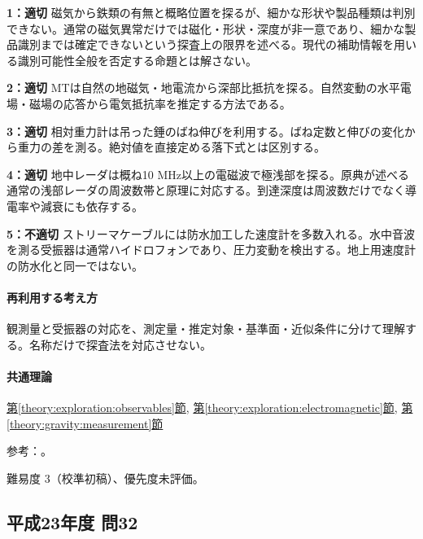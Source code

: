 \noindent\textbf{1：適切} 磁気から鉄類の有無と概略位置を探るが、細かな形状や製品種類は判別できない。通常の磁気異常だけでは磁化・形状・深度が非一意であり、細かな製品識別までは確定できないという探査上の限界を述べる。現代の補助情報を用いる識別可能性全般を否定する命題とは解さない。\par

\noindent\textbf{2：適切} MTは自然の地磁気・地電流から深部比抵抗を探る。自然変動の水平電場・磁場の応答から電気抵抗率を推定する方法である。\par

\noindent\textbf{3：適切} 相対重力計は吊った錘のばね伸びを利用する。ばね定数と伸びの変化から重力の差を測る。絶対値を直接定める落下式とは区別する。\par

\noindent\textbf{4：適切} 地中レーダは概ね10 MHz以上の電磁波で極浅部を探る。原典が述べる通常の浅部レーダの周波数帯と原理に対応する。到達深度は周波数だけでなく導電率や減衰にも依存する。\par

\noindent\textbf{5：不適切} ストリーマケーブルには防水加工した速度計を多数入れる。水中音波を測る受振器は通常ハイドロフォンであり、圧力変動を検出する。地上用速度計の防水化と同一ではない。\par

\paragraph{再利用する考え方} 観測量と受振器の対応を、測定量・推定対象・基準面・近似条件に分けて理解する。名称だけで探査法を対応させない。

\paragraph{共通理論} \hyperref[theory:exploration:observables]{第\ref*{theory:exploration:observables}節}, \hyperref[theory:exploration:electromagnetic]{第\ref*{theory:exploration:electromagnetic}節}, \hyperref[theory:gravity:measurement]{第\ref*{theory:gravity:measurement}節}

\par 参考：\cite{usgs_marine_seismic,usgs_mt_metadata}。

\par 難易度 3（校準初稿）、優先度未評価。

\subsection{平成23年度 問32}
\label{q:h23-reg-applied-32}

